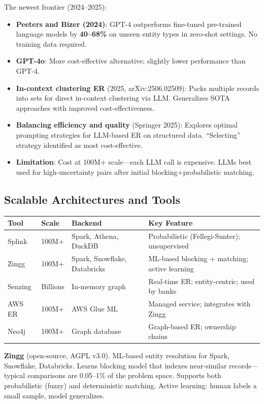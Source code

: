 \documentclass[11pt]{article}
\begin{document}
The newest frontier (2024--2025):

\begin{itemize}
\item \textbf{Peeters and Bizer (2024)}: GPT-4 outperforms fine-tuned pre-trained language models by \textbf{40--68\%} on unseen entity types in zero-shot settings. No training data required.
\item \textbf{GPT-4o}: More cost-effective alternative; slightly lower performance than GPT-4.
\item \textbf{In-context clustering ER} (2025, arXiv:2506.02509): Packs multiple records into sets for direct in-context clustering via LLM. Generalizes SOTA approaches with improved cost-effectiveness.
\item \textbf{Balancing efficiency and quality} (Springer 2025): Explores optimal prompting strategies for LLM-based ER on structured data. ``Selecting'' strategy identified as most cost-effective.
\item \textbf{Limitation}: Cost at 100M+ scale---each LLM call is expensive. LLMs best used for high-uncertainty pairs after initial blocking+probabilistic matching.
\end{itemize}

\subsection{Scalable Architectures and Tools}

\begin{center}
\small
\begin{tabular}{p{2.2cm}p{2cm}p{3cm}p{4.5cm}}
\toprule
\textbf{Tool} & \textbf{Scale} & \textbf{Backend} & \textbf{Key Feature} \\
\midrule
Splink & 100M+ & Spark, Athena, DuckDB & Probabilistic (Fellegi-Sunter); unsupervised \\
Zingg & 100M+ & Spark, Snowflake, Databricks & ML-based blocking + matching; active learning \\
Senzing & Billions & In-memory graph & Real-time ER; entity-centric; used by banks \\
AWS ER & 100M+ & AWS Glue ML & Managed service; integrates with Zingg \\
Neo4j & 100M+ & Graph database & Graph-based ER; ownership chains \\
\bottomrule
\end{tabular}
\end{center}

\textbf{Zingg} (open-source, AGPL v3.0). ML-based entity resolution for Spark, Snowflake, Databricks. Learns blocking model that indexes near-similar records---typical comparisons are 0.05--1\% of the problem space. Supports both probabilistic (fuzzy) and deterministic matching. Active learning: human labels a small sample, model generalizes.
\end{document}
